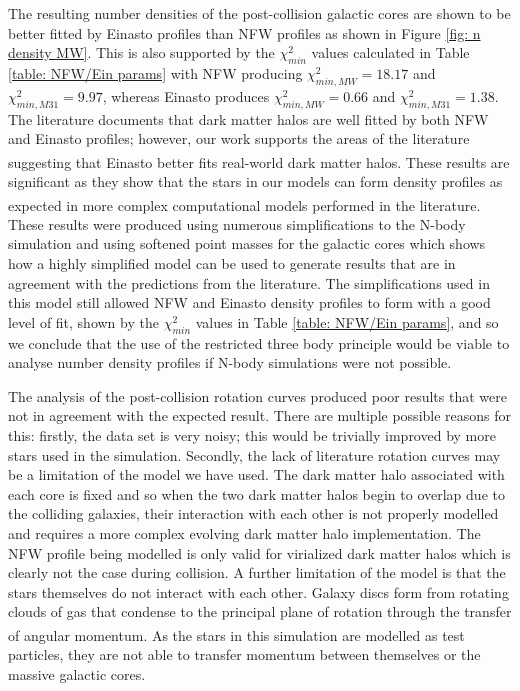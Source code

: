 \documentclass[10pt, twocolumn]{revtex4}    %
\begin{document}
The resulting number densities of the post-collision galactic cores are shown to be better fitted by Einasto profiles than NFW profiles as shown in Figure \ref{fig: n density MW}. This is also supported by the $\chi^2_{min}$ values calculated in Table \ref{table: NFW/Ein params} with NFW producing $\chi^2_{min,MW}=18.17$ and $\chi^2_{min,M31}=9.97$, whereas Einasto produces $\chi^2_{min,MW}=0.66$ and $\chi^2_{min,M31}=1.38$. The literature documents that dark matter halos are well fitted by both NFW and Einasto profiles; however, our work supports the areas of the literature suggesting that Einasto better fits real-world dark matter halos.\textsuperscript{\cite{AnFittingfunctionsdark2013}}
These results are significant as they show that the stars in our models can form density profiles as expected in more complex computational models performed in the literature.\textsuperscript{\cite{CoeDarkMatterHalo2010}} These results were produced using numerous simplifications to the N-body simulation and using softened point masses for the galactic cores which shows how a highly simplified model can be used to generate results that are in agreement with the predictions from the literature. The simplifications used in this model still allowed NFW and Einasto density profiles to form with a good level of fit, shown by the $\chi^2_{min}$ values in Table \ref{table: NFW/Ein params}, and so we conclude that the use of the restricted three body principle would be viable to analyse number density profiles if N-body simulations were not possible.

The analysis of the post-collision rotation curves produced poor results that were not in agreement with the expected result. There are multiple possible reasons for this: firstly, the data set is very noisy; this would be trivially improved by more stars used in the simulation. Secondly, the lack of literature rotation curves may be a limitation of the model we have used. The dark matter halo associated with each core is fixed and so when the two dark matter halos begin to overlap due to the colliding galaxies, their interaction with each other is not properly modelled and requires a more complex evolving dark matter halo implementation. The NFW profile being modelled is only valid for virialized dark matter halos which is clearly not the case during collision. A further limitation of the model is that the stars themselves do not interact with each other. Galaxy discs form from rotating clouds of gas that condense to the principal plane of rotation through the transfer of angular momentum.\textsuperscript{\cite{EggenEvidencemotionsold1962}} As the stars in this simulation are modelled as test particles, they are not able to transfer momentum between themselves or the massive galactic cores.
\end{document}
